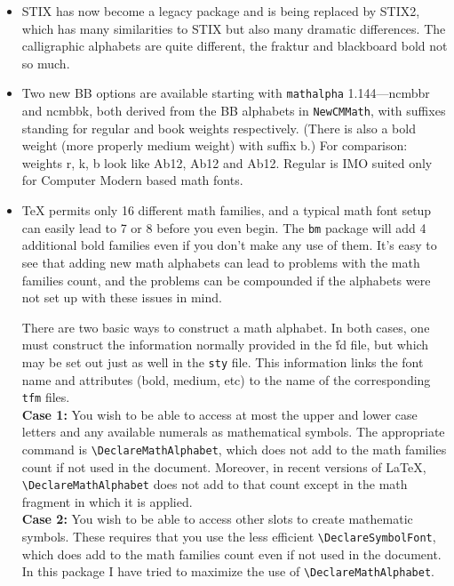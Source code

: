 \documentclass[11pt]{article}
\begin{document}
\begin{itemize}
\item STIX has now become a legacy package and is being replaced by STIX2, which has many similarities to STIX but also many dramatic differences. The calligraphic alphabets are quite different, the fraktur and blackboard bold not so much. 
\item Two  new BB options are available starting with {\tt mathalpha} 1.144---\textsf{ncmbbr} and \textsf{ncmbbk}, both derived from the BB alphabets in {\tt NewCMMath}, with suffixes  standing for regular and book weights respectively. (There is also a bold weight (more properly medium weight) with suffix \textsf{b}.) For comparison: weights \textsf{r, k, b} look like {\ncmbbr Ab12}, {\ncmbbk Ab12} and {\ncmbbb Ab12}. Regular is IMO suited only for Computer Modern based math fonts.
\item TeX permits only 16 different math families, and a typical math font setup can easily lead to 7 or 8 before you even begin. The {\tt bm} package will add 4 additional bold families even if you don't make any use of them. It's easy to see that adding new math alphabets can lead to problems with the math families count, and the problems can be compounded if the alphabets were not set up with these issues in mind.

There are two basic ways to construct a math alphabet. In both cases, one must construct the information normally provided in the {\.fd} file, but which may be set out just as well in the {\tt sty} file. This information links the font name and attributes (bold, medium, etc) to the name of the corresponding {\tt tfm} files.\\
\textbf{Case 1:} You wish to be able to access at most the upper and lower case letters and any available numerals as mathematical symbols. The appropriate command is \verb|\DeclareMathAlphabet|, which does not add to the math families count if not used in the document. Moreover, in recent versions of \LaTeX, \verb|\DeclareMathAlphabet| does not add to that count except in the math fragment in which it is applied.\\
\textbf{Case 2:}  You wish to be able to access other slots to create mathematic symbols. These requires that you use the less efficient \verb|\DeclareSymbolFont|, which does add to the math families count even if not used in the document.
In this package I have tried to  maximize the use of \verb|\DeclareMathAlphabet|.


\end{itemize}
\end{document}
